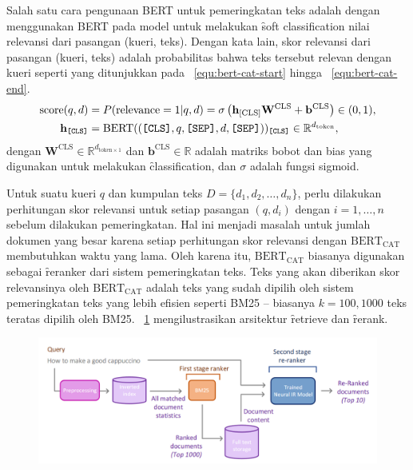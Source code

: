 		Salah satu cara pengunaan BERT untuk pemeringkatan teks adalah dengan menggunakan BERT pada
		model untuk melakukan \f{soft classification} nilai relevansi dari pasangan (kueri, teks). Dengan kata lain, skor relevansi dari pasangan (kueri, teks) adalah probabilitas bahwa teks tersebut relevan dengan kueri seperti yang ditunjukkan pada \equ~\ref{equ:bert-cat-start} hingga \equ~\ref{equ:bert-cat-end}.
		\begin{align}
			\label{equ:bert-cat-start}
			\text{score}(q,d) &= P(\text{relevance} = 1 | q, d) = \sigma\left(  \mathbf{h}_{\text{[CLS]}} \mathbf{W}^{\text{CLS}}+\mathbf{b}^{\text{CLS}} \right) \in (0,1), \\
			\label{equ:bert-cat-end}
			\mathbf{h}_{\text{\texttt{[CLS]}}} &= \text{BERT}((\text{\texttt{[CLS]}}, q, \text{\texttt{[SEP]}}, d, \text{\texttt{[SEP]}}))_{\text{\texttt{[CLS]}}} \in \mathbb{R}^{d_{\text{token}}},
		\end{align}
		dengan $\mathbf{W}^{\text{CLS}} \in \mathbb{R}^{d_{\text{token} \times 1}}$ dan $\mathbf{b}^{\text{CLS}} \in \mathbb{R}$ adalah matriks bobot dan bias yang digunakan untuk melakukan \f{classification}, dan $\sigma$ adalah fungsi sigmoid.

		Untuk suatu kueri $q$ dan kumpulan teks $D = \{d_1, d_2, \dots, d_n\}$, perlu dilakukan perhitungan skor relevansi untuk setiap pasangan $(q, d_i)$ dengan $i=1,\dots,n$ sebelum dilakukan pemeringkatan. Hal ini menjadi masalah untuk jumlah dokumen yang besar karena setiap perhitungan skor relevansi dengan $\text{BERT}_{\text{CAT}}$ membutuhkan waktu yang lama. Oleh karena itu, $\text{BERT}_{\text{CAT}}$ biasanya digunakan sebagai \f{reranker} dari sistem pemeringkatan teks. Teks yang akan diberikan skor relevansinya oleh $\text{BERT}_{\text{CAT}}$ adalah teks yang sudah dipilih oleh sistem pemeringkatan teks yang lebih efisien seperti {BM25} -- biasanya $k = 100, 1000$ teks teratas dipilih oleh {BM25}. \pic~\ref{fig:bert-cat-withbm25} mengilustrasikan arsitektur \f{retrieve} dan \f{rerank}.

		\begin{figure}
			\centering
			\includegraphics[width=1\textwidth]{assets/pics/neural-ir.png}
			\label{fig:bert-cat-withbm25}
		\end{figure}

